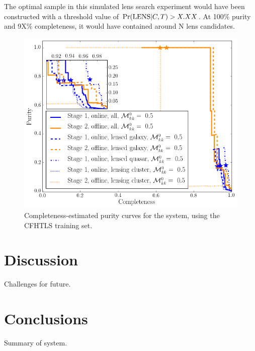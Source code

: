 \documentclass[useAMS,usenatbib,a4paper]{mn2e}
\begin{document}
The optimal sample in this simulated lens search experiment would have been
constructed with a threshold value of ${\rm Pr}({\rm LENS}|C,T) > X.XX$. At 100\% purity
and 9X\% completeness, it would have contained around N lens candidates.


\begin{figure}
\centering\includegraphics[width=\linewidth]{sw-system-figs/completeness_purity.png}
\caption{Completeness-estimated purity curves for the \sw system, using
the CFHTLS training set.}
\label{fig:results:sample:CP}
\end{figure}



\section{Discussion}
\label{sec:discuss}

Challenges for future.


\section{Conclusions}
\label{sec:conclude}

Summary of system.
\end{document}
